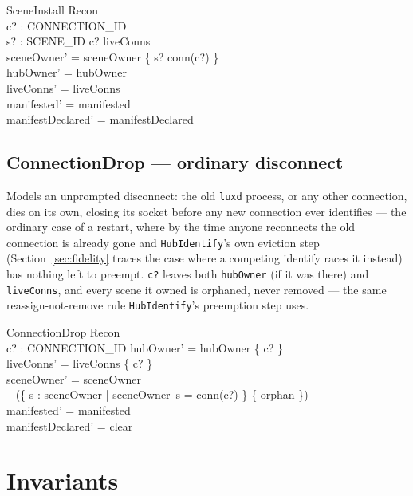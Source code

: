 \documentclass[a4paper,10pt,fleqn]{article}
\begin{document}
\begin{schema}{SceneInstall}
  \Delta Recon \\
  c? : CONNECTION\_ID \\
  s? : SCENE\_ID
\where
  c? \in liveConns \\
  sceneOwner' = sceneOwner \oplus \{ s? \mapsto conn(c?) \} \\
  hubOwner' = hubOwner \\
  liveConns' = liveConns \\
  manifested' = manifested \\
  manifestDeclared' = manifestDeclared
\end{schema}

\subsection{ConnectionDrop --- ordinary disconnect}

Models an unprompted disconnect: the old \texttt{luxd} process, or any
other connection, dies on its own, closing its socket before any new
connection ever identifies --- the ordinary case of a restart, where by
the time anyone reconnects the old connection is already gone and
\texttt{HubIdentify}'s own eviction step (Section~\ref{sec:fidelity}
traces the case where a competing identify races it instead) has nothing
left to preempt.  \texttt{c?} leaves both \texttt{hubOwner} (if it was
there) and \texttt{liveConns}, and every scene it owned is orphaned,
never removed --- the same reassign-not-remove rule
\texttt{HubIdentify}'s preemption step uses.

\begin{schema}{ConnectionDrop}
  \Delta Recon \\
  c? : CONNECTION\_ID
\where
  hubOwner' = hubOwner \setminus \{ c? \} \\
  liveConns' = liveConns \setminus \{ c? \} \\
  sceneOwner' = sceneOwner \oplus \\
  \quad~ (\{ s : \dom sceneOwner | sceneOwner~s = conn(c?) \} \cross \{ orphan \}) \\
  manifested' = manifested \\
  manifestDeclared' = clear
\end{schema}

\section{Invariants}
\label{sec:inv}
\end{document}
